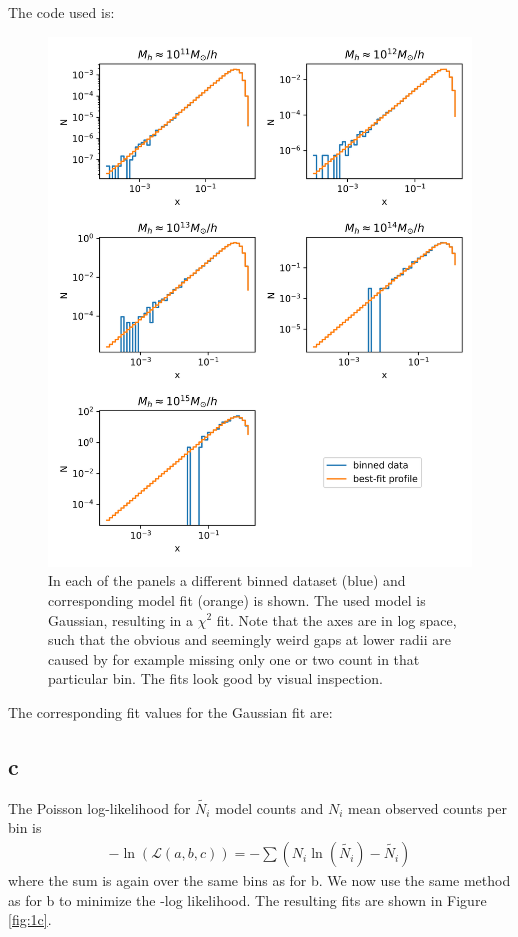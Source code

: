 The code used is:


\begin{figure}[h!]
    \centering
    \includegraphics[width=0.9\linewidth]{./my_solution_1b.png}
    \caption{In each of the panels a different binned dataset (blue) and corresponding model fit (orange) is shown. The used model is Gaussian, resulting in a $\chi^2$ fit.
    Note that the axes are in log space, such that the obvious and seemingly weird gaps at lower radii are caused by for example missing only one or two count in that particular bin.
    The fits look good by visual inspection.}
    \label{fig:1b}
\end{figure}

The corresponding fit values for the Gaussian fit are:




\subsection{c}

The Poisson log-likelihood for $\tilde{N_i}$ model counts and $N_i$ mean observed counts per bin is
\begin{align*}
    -\ln(\mathcal{L}(a,b,c))=-\sum (N_i\ln(\tilde{N_i})-\tilde{N_i})
\end{align*}
where the sum is again over the same bins as for b.
We now use the same method as for b to minimize the -log likelihood. The resulting fits are shown in Figure \ref{fig:1c}.

